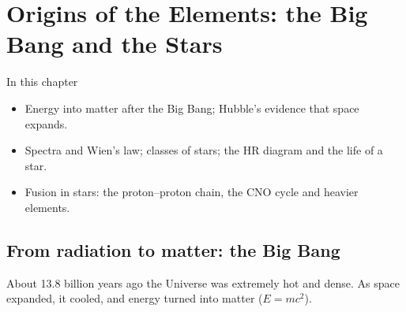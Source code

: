 \chapter{Origins of the Elements: the Big Bang and the Stars}\label{ch1:chap}

\newlength\chOneNucW
\newlength\chOneNucV
\newcommand\chOneNuc[3]{%
  \settowidth\chOneNucW{$\scriptstyle #1$}\settowidth\chOneNucV{$\scriptstyle #2$}%
  \ifdim\chOneNucV>\chOneNucW\chOneNucW=\chOneNucV\fi
  {}^{\makebox[\chOneNucW][r]{$\scriptstyle #1$}}_{\makebox[\chOneNucW][r]{$\scriptstyle #2$}}\mathrm{#3}}

\begin{summarybox}{In this chapter}
\begin{itemize}
  \item Energy into matter after the Big Bang; Hubble's evidence that space expands.
  \item Spectra and Wien's law; classes of stars; the HR diagram and the life of a star.
  \item Fusion in stars: the proton--proton chain, the CNO cycle and heavier elements.
\end{itemize}
\end{summarybox}

\section{From radiation to matter: the Big Bang}\label{ch1:sec:bigbang}

\begin{bigidea}
About 13.8 billion years ago the Universe was extremely hot and dense. As space expanded, it
cooled, and energy turned into matter ($E = mc^2$).
\end{bigidea}

\begin{keywords}
\end{keywords}

